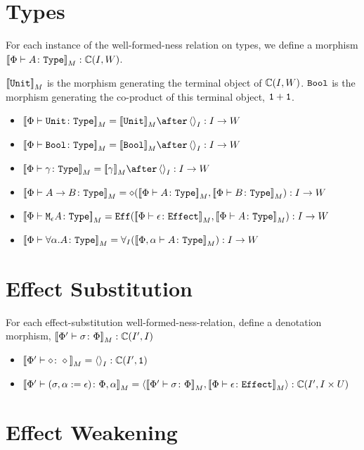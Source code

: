 \documentclass{report}
\newcommand{\allI}[0]{\forall_I}
\newcommand\type[0]{\texttt{Type}}
\newcommand\effect[0]{\texttt{Effect}}
\newcommand\ciw[0]{\C(I, W)}
\newcommand\cii[0]{\C(I', I)}
\newcommand\Eff[0]{\texttt{Eff}}
\begin{document}
\section{Types}
For each instance of the well-formed-ness relation on types, we define a morphism $\deno{\typerelation{\P}{A}{\type}}: \ciw$.

${\bf [\![}\texttt{Unit}{\bf ]\!]}_M$ is the morphism generating the terminal object of $\ciw$. $\texttt{Bool}$ is the morphism generating the co-product of this terminal object, $\texttt{1} + \texttt{1}$.
\begin{itemize}
    \item $\deno{\typerelation{\P}{\U}{\type}} = \deno{\U}\after\term{I}: I \rightarrow W$
    
    \item $\deno{\typerelation{\P}{\B}{\type}} = \deno{\B}\after\term{I}: I \rightarrow W$
    
    \item $\deno{\typerelation{\P}{\g}{\type}} = \deno{\g}\after\term{I} : I \rightarrow W$
    
    \item $\deno{\typerelation{\P}{\ab}{\type}} = \diamond(\deno{\typerelation{\P}{A}{\type}},\deno{\typerelation{\P}{B}{\type}}): I \rightarrow W$
    
    \item $\deno{\typerelation{\P}{\mea}{\type}} =\Eff(\deno{\typerelation{\P}{\e}{\effect}},\deno{\typerelation{\P}{A}{\type}}): I \rightarrow W$
    \item $\deno{\typerelation{\P}{\all{\a}{A}}{\type}} =\allI(\deno{\typerelation{\P,\a}{A}{\type}}): I \rightarrow W$
\end{itemize}

\section{Effect Substitution}

For each effect-substitution well-formed-ness-relation, define a denotation morphism, $\deno{\typerelation{\P'}{\si}{\P}}: \cii$

\begin{itemize}
    \item ${\bf [\![}\Phi' \vdash \diamond \colon \diamond{\bf ]\!]}_M = \left\langle\right\rangle_{I}: \mathbb{C}(I', \texttt{1})$
    \item $\deno{\typerelation{\P'}{(\si, \a\setto\e)}{\P,\a}} = \pr{\deno{\typerelation{\P'}{\si}{\P}}}{\deno{\typerelation{\P}{\e}{\effect}}}: \C(I', I\times U)$
\end{itemize}
\section{Effect Weakening}
\end{document}
